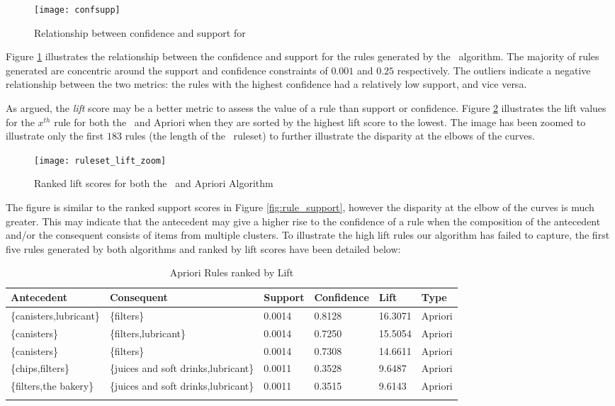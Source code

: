 \begin{figure}[H]
\centering
\texttt{[image: confsupp]}
\caption{Relationship between confidence and support for \algo}
\label{fig:confsupp}
\end{figure}
Figure \ref{fig:confsupp} illustrates the relationship between the confidence and support for the rules generated by the \algo\ algorithm.
The majority of rules generated are concentric around the support and confidence constraints of $0.001$ and $0.25$ respectively. The outliers indicate a negative relationship between the two metrics: the rules with the highest confidence had a relatively low support, and vice versa.

As  argued, the \textit{lift} score may be a better metric to assess the value of a rule than support or confidence. Figure \ref{fig:rule_lift} illustrates the lift values for the $x^{th}$ rule for both the \algo\ and Apriori when they are sorted by the highest lift score to the lowest. The image has been zoomed to illustrate only the first $183$ rules (the length of the \algo\ ruleset) to further illustrate the disparity at the elbows of the curves.
\begin{figure}[H]
\centering
\texttt{[image: ruleset\_lift\_zoom]}
\caption{Ranked lift scores for both the \algo\ and Apriori Algorithm}
\label{fig:rule_lift}
\end{figure}
The figure is similar to the ranked support scores in Figure \ref{fig:rule_support}, however the disparity at the elbow of the curves is much greater. This may indicate that the antecedent may give a higher rise to the confidence of a rule when the composition of the antecedent and/or the consequent consists of items from multiple clusters. To illustrate the high lift rules our algorithm has failed to capture, the first five rules generated by both algorithms and ranked by lift scores have been detailed below:

\begin{longtable}
{@{}llllll@{}}\toprule Antecedent& Consequent& Support& Confidence& Lift& Type\\*\midrule\endfirsthead\endhead
\{canisters,lubricant\} & \{filters\} & 0.0014 & 0.8128 & 16.3071 & Apriori\\
\{canisters\} & \{filters,lubricant\} & 0.0014 & 0.7250 & 15.5054 & Apriori\\
\{canisters\} & \{filters\} & 0.0014 & 0.7308 & 14.6611 & Apriori\\
\{chips,filters\} & \{juices and soft drinks,lubricant\} & 0.0011 & 0.3528 & 9.6487 & Apriori\\
\{filters,the bakery\} & \{juices and soft drinks,lubricant\} & 0.0011 & 0.3515 & 9.6143 & Apriori\\
\midrule\caption{Apriori Rules ranked by Lift}\label{tab:apri_lift}\end{longtable}

